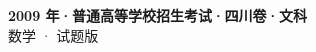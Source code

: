 \documentclass[zihao=-4, a4paper]{ctexart}
\begin{document}
\begin{center}
  {\Large\bfseries 2009 年·普通高等学校招生考试·四川卷·文科}\\[4pt]
  {\large 数学 · 试题版}
\end{center}
\medskip
{}

\end{document}
